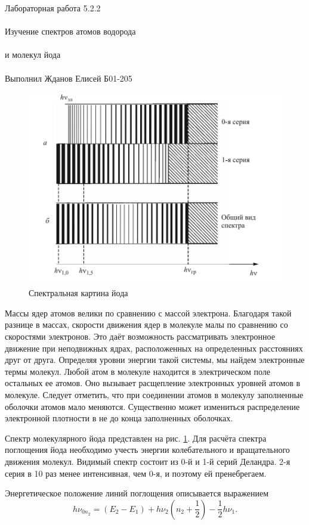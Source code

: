 \documentclass{astroedu-lab}
\begin{document}
\begin{problem}{\huge Лабораторная работа 5.2.2\\\\Изучение спектров атомов водорода\\\\и молекул йода\\\\Выполнил Жданов Елисей Б01-205}
	\begin{figure}
		\includegraphics[width=1.0\linewidth]{Screenshot_3}
		\caption{Спектральная картина йода}
		\label{fig:screenshot3}
	\end{figure} 
	Массы ядер атомов велики по сравнению с массой электрона. Благодаря такой разнице в массах, скорости движения ядер в молекуле малы по сравнению со скоростями электронов. Это даёт возможность	рассматривать электронное движение при неподвижных ядрах, расположенных на определенных расстояниях друг от друга. Определяя уровни энергии такой системы, мы найдем электронные термы молекул. Любой атом в молекуле находится в электрическом поле остальных ее атомов. Оно вызывает расщепление электронных уровней атомов в молекуле. Следует отметить, что при соединении атомов в молекулу заполненные оболочки атомов мало меняются. Существенно может измениться распределение электронной плотности в не до конца заполненных оболочках.
	
	
	Спектр молекулярного йода представлен на рис. \ref{fig:screenshot3}.
	Для расчёта спектра поглощения йода необходимо учесть энергии колебательного и вращательного движения молекул. Видимый спектр состоит из 0-й и 1-й серий Деландра. 2-я серия в 10 раз менее интенсивная, чем 0-я, и поэтому ей пренебрегаем. 
	
	Энергетическое	положение линий поглощения описывается выражением
	\begin{equation}\label{eq:йод}
		h \nu_{0 n_2} = (E_2 - E_1 )+ h \nu_2 \left(n_2+\dfrac{1}{2}\right) - \dfrac{1}{2}h \nu_1.
	\end{equation}


\end{problem}
\end{document}
